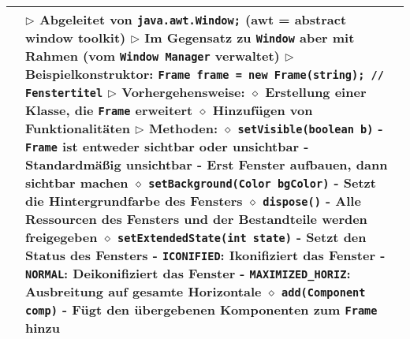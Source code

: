 \begin{longtable}{ | p{} p{} | }
	\makecell[l]{Klasse Frame} & \makecell[l]{
	$\triangleright$ Abgeleitet von \texttt{java.awt.Window;} (awt = abstract window toolkit) \\
	$\triangleright$ Im Gegensatz zu \texttt{Window} aber mit Rahmen (vom \texttt{Window Manager} verwaltet) \\
	$\triangleright$ Beispielkonstruktor: \texttt{Frame frame = new Frame(string); // Fenstertitel} \\
	$\triangleright$ Vorhergehensweise: \\
	\hspace{0.4cm} $\diamond$ Erstellung einer Klasse, die \texttt{Frame} erweitert \\
	\hspace{0.4cm} $\diamond$ Hinzufügen von Funktionalitäten \\
	$\triangleright$ Methoden: \\
	\hspace{0.4cm} $\diamond$ \texttt{setVisible(boolean b)} \\ 
	\hspace{0.6cm} - \texttt{Frame} ist entweder sichtbar oder unsichtbar \\ 
	\hspace{0.6cm} - Standardmä\ss ig unsichtbar \\
	\hspace{0.6cm} - Erst Fenster aufbauen, dann sichtbar machen \\
	\hspace{0.4cm} $\diamond$ \texttt{setBackground(Color bgColor)} \\
	\hspace{0.6cm} - Setzt die Hintergrundfarbe des Fensters \\
	\hspace{0.4cm} $\diamond$ \texttt{dispose()} \\
	\hspace{0.6cm} - Alle Ressourcen des Fensters und der Bestandteile werden freigegeben \\
	\hspace{0.4cm} $\diamond$ \texttt{setExtendedState(int state)} \\
	\hspace{0.6cm} - Setzt den Status des Fensters \\
	\hspace{0.6cm} - \texttt{ICONIFIED}: Ikonifiziert das Fenster \\
	\hspace{0.6cm} - \texttt{NORMAL}: Deikonifiziert das Fenster \\
	\hspace{0.6cm} - \texttt{MAXIMIZED\_HORIZ}: Ausbreitung auf gesamte Horizontale \\
	\hspace{0.4cm} $\diamond$ \texttt{add(Component comp)} \\
	\hspace{0.6cm} - Fügt den übergebenen Komponenten zum \texttt{Frame} hinzu \\
	} \\ \hline


\end{longtable}
